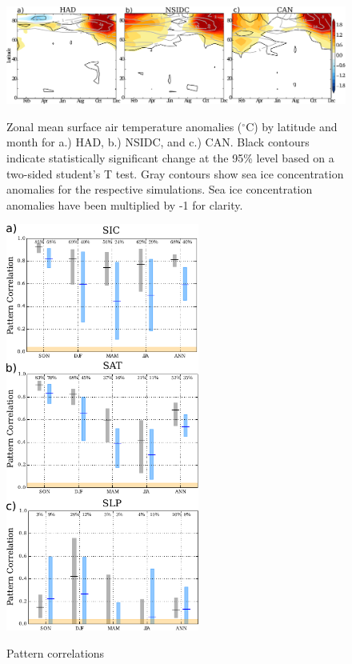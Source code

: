 \documentclass[twocol]{ametsoc}
\begin{document}
\begin{figure}[t]
  \noindent\includegraphics[width=39pc,angle=0]{SATwithlat.pdf}\\
  \caption{Zonal mean surface air temperature anomalies ($^\circ$C) by latitude and month for a.) HAD, b.) NSIDC, and c.) CAN. Black contours indicate statistically significant change at the 95\% level based on a two-sided student's T test. Gray contours show sea ice concentration anomalies for the respective simulations. Sea ice concentration anomalies have been multiplied by -1 for clarity.
}\label{fig:f1b}
\end{figure}

\begin{figure}
  \noindent\includegraphics[width=15pc,angle=0]{pattcorrseas_cmpmeanBC.pdf}\\
  \caption{Pattern correlations
}\label{fig:fig4}
\end{figure}
\end{document}
